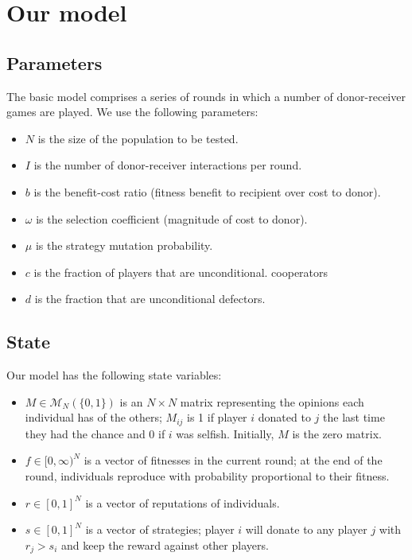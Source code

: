 \documentclass{amsart}
\begin{document}
\section{Our model}
\label{sec:model}

\subsection{Parameters}

The basic model comprises a series of rounds in which a number of
donor-receiver games are played. We use the following parameters:

\begin{itemize}
\item $N$ is the size of the population to be tested.
\item $I$ is the number of donor-receiver interactions per round.
\item $b$ is the benefit-cost ratio (fitness benefit to recipient over
  cost to donor).
\item $\omega$ is the selection coefficient (magnitude of cost to
  donor).
\item $\mu$ is the strategy mutation probability.
\item $c$ is the fraction of players that are unconditional.
  cooperators
\item $d$ is the fraction that are unconditional defectors.
\end{itemize}

\subsection{State}

Our model has the following state variables:

\begin{itemize}
\item $M \in \mathcal{M}_N(\{0,1\})$ is an $N \times N$ matrix
  representing the opinions each individual has of the others;
  $M_{ij}$ is 1 if player $i$ donated to $j$ the last time they had
  the chance and 0 if $i$ was selfish. Initially, $M$ is the zero
  matrix.
\item $f \in [0, \infty)^N$ is a vector of fitnesses in the current
  round; at the end of the round, individuals reproduce with
  probability proportional to their fitness.
\item $r \in [0,1]^N$ is a vector of reputations of individuals.
\item $s \in [0,1]^N$ is a vector of strategies; player $i$ will
  donate to any player $j$ with $r_j > s_i$ and keep the reward
  against other players.
\end{itemize}
\end{document}
